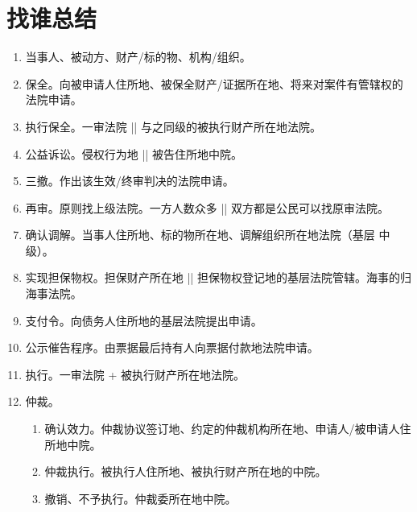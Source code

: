 \section{找谁总结}
\begin{enumerate}
  \item 当事人、被动方、财产/标的物、机构/组织。
  \item 保全。向被申请人住所地、被保全财产/证据所在地、将来对案件有管辖权的法院申请。
  \item 执行保全。一审法院 || 与之同级的被执行财产所在地法院。
  \item 公益诉讼。侵权行为地 || 被告住所地中院。
  \item 三撤。作出该生效/终审判决的法院申请。
  \item 再审。原则找上级法院。一方人数众多 || 双方都是公民可以找原审法院。
  \item 确认调解。当事人住所地、标的物所在地、调解组织所在地法院（基层 \hz 中级）。
  \item 实现担保物权。担保财产所在地 || 担保物权登记地的基层法院管辖。海事的归海事法院。
  \item 支付令。向债务人住所地的基层法院提出申请。
  \item 公示催告程序。由票据最后持有人向票据付款地法院申请。
  \item 执行。一审法院 + 被执行财产所在地法院。
  \item 仲裁。
        \begin{enumerate}
          \item 确认效力。仲裁协议签订地、约定的仲裁机构所在地、申请人/被申请人住所地中院。
          \item 仲裁执行。被执行人住所地、被执行财产所在地的中院。
          \item 撤销、不予执行。仲裁委所在地中院。
        \end{enumerate}
\end{enumerate}
